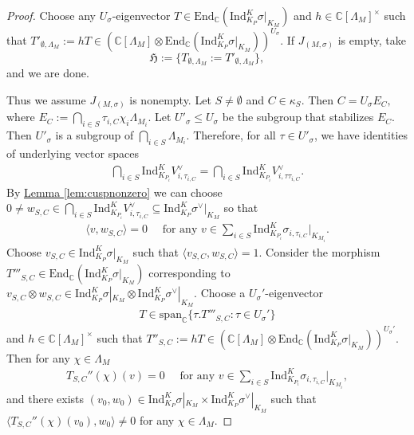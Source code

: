 \documentclass[10pt]{amsart}
\theoremstyle{definition}
\numberwithin{equation}{section}
\numberwithin{equation}{subsection}
\newcommand{\Ind}{\mathrm{Ind}}
\newcommand{\CC}{\mathbb{C}}
\begin{document}
\begin{proof}      
  Choose any $U_\sigma$-eigenvector $T\in \mathrm{End}_\CC (\Ind_{K_P}^K \sigma|_{K_M})$ and $h\in \CC[\Lambda_M]^\times$ such that $T'_{\emptyset,\Lambda_M}:=hT\in (\CC[\Lambda_M]\otimes \mathrm{End}_\CC (\Ind_{K_P}^K \sigma|_{K_M}))^{U_\sigma}.$ If $J_{(M,\sigma)}$ is empty, take $$\mathfrak{H}:=\{T_{\emptyset,\Lambda_M}:=T'_{\emptyset,\Lambda_M}\},$$ and we are done.
 
 Thus we assume $J_{(M,\sigma)}$ is nonempty. Let $S\neq \emptyset$ and $C\in \kappa_S$. Then $C=U_\sigma E_C,$ where $E_C:=\bigcap_{i\in S} \tau_{i,C}\chi_i\Lambda_{M_i}.$  
Let $U'_\sigma\le U_\sigma$ be the subgroup that stabilizes $E_C$. Then $U'_\sigma$ is a subgroup of $\bigcap_{i\in S}\Lambda_{M_i}.$  Therefore, for all $\tau\in U'_{\sigma}$, we have identities of underlying vector spaces
\begin{align*}
    \bigcap_{i\in S}\mathrm{Ind}_{K_{P_i}}^{K}V_{i,\tau_{i,C}}^\lor=\bigcap_{i\in S}\mathrm{Ind}_{K_{P_i}}^{K}V_{i,\tau\tau_{i,C}}^\lor.
\end{align*}
By \hyperref[lem:cuspnonzero]{Lemma \ref{lem:cuspnonzero}} we can choose $0\neq w_{S,C}\in \bigcap_{i\in S}\mathrm{Ind}_{K_{P_i}}^{K}V_{i,\tau_{i,C}}^\lor \subseteq\mathrm{Ind}_{K_{P}}^{K} \sigma^\lor|_{K_M}$ so that
\begin{align*}
\langle v,w_{S,C}\rangle=0 \quad\textrm{ for any } v\in \sum_{i\in S}\mathrm{Ind}_{K_{P_i}}^{K} \sigma_{i,\tau_{i,C}}|_{K_{M_i}}.
\end{align*}
Choose $v_{S,C}\in \Ind_{K_P}^K\sigma|_{K_M}$ such that $\langle v_{S,C},w_{S,C}\rangle=1$. Consider the morphism $T'''_{S,C}\in \mathrm{End}_\CC (\Ind_{K_P}^K \sigma|_{K_M})$ corresponding to $v_{S,C}\otimes w_{S,C}\in \mathrm{Ind}_{K_P}^K\sigma|_{K_M}\otimes \mathrm{Ind}_{K_P}^K\sigma^\lor|_{K_M}.$ Choose a $U_\sigma'$-eigenvector 
\begin{align*}
    T\in \mathrm{span}_\CC\{ \tau.T'''_{S,C}: \tau\in U_{\sigma}'\}
\end{align*}
and $h\in \CC[\Lambda_M]^\times$ such that $T''_{S,C}:=hT\in (\CC[\Lambda_M]\otimes \mathrm{End}_\CC (\Ind_{K_P}^K \sigma|_{K_M}))^{U_\sigma'}.$ Then for any $\chi\in \Lambda_M$
\begin{align*}
    T_{S,C}''(\chi)(v)=0\quad\textrm{ for any } v\in \sum_{i\in S}\mathrm{Ind}_{K_{P_i}}^{K} \sigma_{i,\tau_{i,C}}|_{K_{M_i}},
\end{align*}
and there exists $(v_0,w_0)\in \Ind_{K_{P}}^K \sigma|_{K_{M}}\times \Ind_{K_{P}}^K \sigma^\lor|_{K_{M}}$ such that $\langle T_{S,C}''(\chi)(v_0),w_0\rangle\neq 0$ for any $\chi\in \Lambda_M.$


\end{proof}
\end{document}
